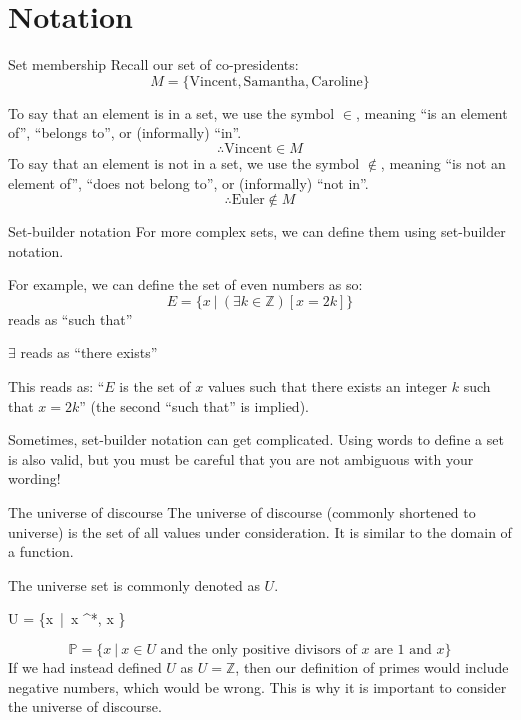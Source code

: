 	\section{Notation}
	\begin{namedframe}{Set membership}
		Recall our set of co-presidents:
		\[M = \{\text{Vincent}, \text{Samantha}, \text{Caroline}\}\]
		
		To say that an element is in a set, we use the symbol $\in$, meaning ``is an element of'', ``belongs to'', or (informally) ``in''.
		\[\therefore \text{Vincent} \in M\]
		To say that an element is not in a set, we use the symbol $\notin$, meaning ``is not an element of'', ``does not belong to'', or (informally) ``not in''.
		\[\therefore \text{Euler} \notin M\]
	\end{namedframe}
	\begin{namedframe}{Set-builder notation}
		For more complex sets, we can define them using set-builder notation.

		For example, we can define the set of even numbers as so:
		\[E = \{x\ |\ (\exists k \in \mathbb{Z})[x = 2k]\}\]
		\textbar{} reads as ``such that''

		$\exists$ reads as ``there exists''

		This reads as: ``$E$ is the set of $x$ values such that there exists an integer $k$ such that $x = 2k$'' (the second ``such that'' is implied).

		\scriptsize
		Sometimes, set-builder notation can get complicated. Using words to define a set is also valid, but you must be careful that you are \alert{not} ambiguous with your wording!
	\end{namedframe}
	\begin{namedframe}{The universe of discourse}
		The universe of discourse (commonly shortened to universe) is the set of all values under consideration. It is similar to the domain of a function.

		The universe set is commonly denoted as $U$.
		\begin{example}
			\begin{compactmath}
				U = \{x\ |\ x \in {}^*, x \}
			\end{compactmath}
			\[\mathbb{P} = \{x\ |\ x \in U \text{ and the only positive divisors of $x$ are $1$ and $x$}\}\]
			If we had instead defined $U$ as $U = \mathbb{Z}$, then our definition of primes would include negative numbers, which would be wrong. This is why it is important to consider the universe of discourse.
		\end{example}
	\end{namedframe}
